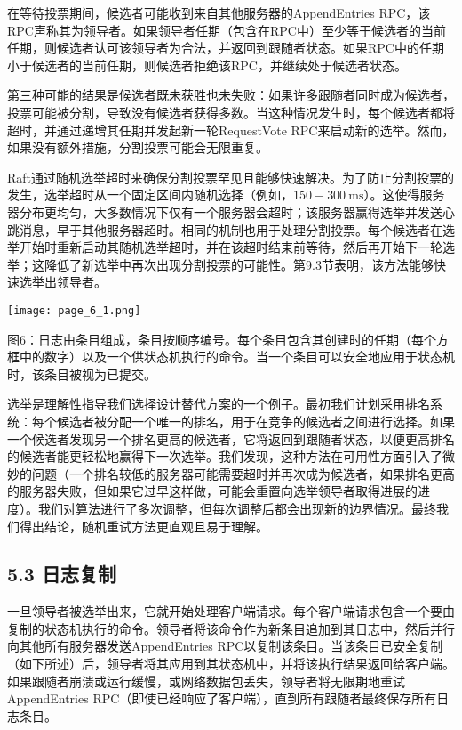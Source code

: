 \documentclass[12pt,a4paper]{report} %
\begin{document}
在等待投票期间，候选者可能收到来自其他服务器的AppendEntries RPC，该RPC声称其为领导者。如果领导者任期（包含在RPC中）至少等于候选者的当前任期，则候选者认可该领导者为合法，并返回到跟随者状态。如果RPC中的任期小于候选者的当前任期，则候选者拒绝该RPC，并继续处于候选者状态。

第三种可能的结果是候选者既未获胜也未失败：如果许多跟随者同时成为候选者，投票可能被分割，导致没有候选者获得多数。当这种情况发生时，每个候选者都将超时，并通过递增其任期并发起新一轮RequestVote RPC来启动新的选举。然而，如果没有额外措施，分割投票可能会无限重复。

Raft通过随机选举超时来确保分割投票罕见且能够快速解决。为了防止分割投票的发生，选举超时从一个固定区间内随机选择（例如，$150-300 \mathrm{~ms}$）。这使得服务器分布更均匀，大多数情况下仅有一个服务器会超时；该服务器赢得选举并发送心跳消息，早于其他服务器超时。相同的机制也用于处理分割投票。每个候选者在选举开始时重新启动其随机选举超时，并在该超时结束前等待，然后再开始下一轮选举；这降低了新选举中再次出现分割投票的可能性。第9.3节表明，该方法能够快速选举出领导者。

\begin{center}
\texttt{[image: page\_6\_1.png]}
\end{center}
\begin{center} 图6：日志由条目组成，条目按顺序编号。每个条目包含其创建时的任期（每个方框中的数字）以及一个供状态机执行的命令。当一个条目可以安全地应用于状态机时，该条目被视为已提交。

\end{center} 选举是理解性指导我们选择设计替代方案的一个例子。最初我们计划采用排名系统：每个候选者被分配一个唯一的排名，用于在竞争的候选者之间进行选择。如果一个候选者发现另一个排名更高的候选者，它将返回到跟随者状态，以便更高排名的候选者能更轻松地赢得下一次选举。我们发现，这种方法在可用性方面引入了微妙的问题（一个排名较低的服务器可能需要超时并再次成为候选者，如果排名更高的服务器失败，但如果它过早这样做，可能会重置向选举领导者取得进展的进度）。我们对算法进行了多次调整，但每次调整后都会出现新的边界情况。最终我们得出结论，随机重试方法更直观且易于理解。

\subsection*{5.3 日志复制}

一旦领导者被选举出来，它就开始处理客户端请求。每个客户端请求包含一个要由复制的状态机执行的命令。领导者将该命令作为新条目追加到其日志中，然后并行向其他所有服务器发送AppendEntries RPC以复制该条目。当该条目已安全复制（如下所述）后，领导者将其应用到其状态机中，并将该执行结果返回给客户端。如果跟随者崩溃或运行缓慢，或网络数据包丢失，领导者将无限期地重试AppendEntries RPC（即使已经响应了客户端），直到所有跟随者最终保存所有日志条目。
\end{document}
